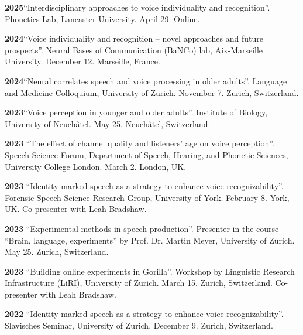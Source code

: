 \documentclass[11pt]{article}
\newcommand{\hangpara}{
 \setlength{\parindent}{0in} %
 \hangindent=0.42in %
}
\begin{document}
\vskip 6pt
\hangpara
{\bf 2025}\hspace{1ex}“Interdisciplinary approaches to voice individuality and recognition”. Phonetics Lab, Lancaster University. April 29. Online. 

\vskip 6pt
\hangpara
{\bf 2024}\hspace{1ex}“Voice individuality and recognition – novel approaches and future prospects”. Neural Bases of Communication (BaNCo) lab, Aix-Marseille University. December 12. Marseille, France. 

\vskip 6pt
\hangpara
{\bf 2024}\hspace{1ex}“Neural correlates speech and voice processing in older adults”. Language and Medicine Colloquium, University of Zurich. November 7. Zurich, Switzerland. 

\vskip 6pt
\hangpara
{\bf 2023}\hspace{1ex}“Voice perception in younger and older adults”. Institute of Biology, University of Neuchâtel. May 25. Neuchâtel, Switzerland. 

\vskip 6pt
\hangpara
{\bf 2023}\hspace{1ex} “The effect of channel quality and listeners’ age on voice perception”. Speech Science Forum, Department of Speech, Hearing, and Phonetic Sciences, University College London. March 2. London, UK.

\vskip 6pt
\hangpara
{\bf 2023}\hspace{1ex} “Identity-marked speech as a strategy to enhance voice recognizability”. Forensic Speech Science Research Group, University of York. February 8. York, UK. Co-presenter with Leah Bradshaw.

\vskip 6pt
\hangpara
{\bf 2023}\hspace{1ex} “Experimental methods in speech production”. Presenter in the course “Brain, language, experiments” by Prof. Dr. Martin Meyer, University of Zurich. May 25. Zurich, Switzerland. 

\vskip 6pt
\hangpara
{\bf 2023}\hspace{1ex} “Building online experiments in Gorilla”. Workshop by Linguistic Research Infrastructure (LiRI), University of Zurich. March 15. Zurich, Switzerland. Co-presenter with Leah Bradshaw.

\vskip 6pt
\hangpara
{\bf 2022}\hspace{1ex} “Identity-marked speech as a strategy to enhance voice recognizability”. Slavisches Seminar, University of Zurich. December 9. Zurich, Switzerland.
\end{document}
